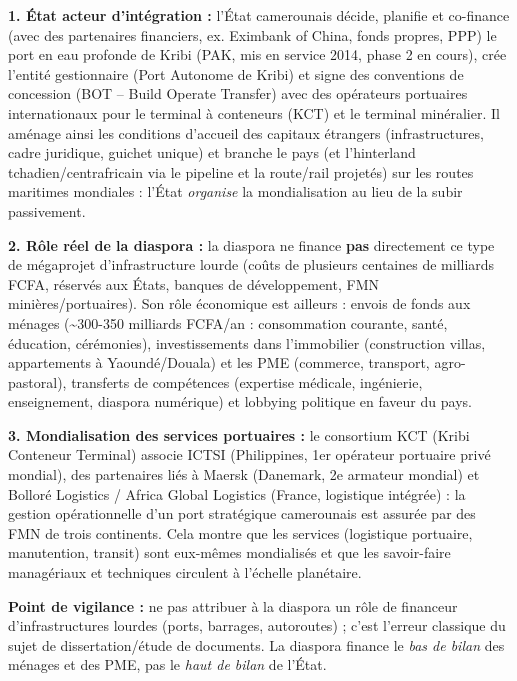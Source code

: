 \documentclass[11pt]{article}
\newcommand{\cle}[1]{{\popxbold\color{popdark}#1}}
\begin{document}
\begin{corrige}
\textbf{1. État acteur d'intégration :} l'État camerounais décide, planifie et co-finance (avec des partenaires financiers, ex. Eximbank of China, fonds propres, PPP) le port en eau profonde de Kribi (PAK, mis en service 2014, phase 2 en cours), crée l'entité gestionnaire (Port Autonome de Kribi) et signe des \cle{conventions de concession} (BOT -- Build Operate Transfer) avec des opérateurs portuaires internationaux pour le terminal à conteneurs (KCT) et le terminal minéralier. Il aménage ainsi les conditions d'accueil des capitaux étrangers (infrastructures, cadre juridique, guichet unique) et branche le pays (et l'hinterland tchadien/centrafricain via le pipeline et la route/rail projetés) sur les routes maritimes mondiales : l'État \emph{organise} la mondialisation au lieu de la subir passivement.

\textbf{2. Rôle réel de la diaspora :} la diaspora ne finance \textbf{pas} directement ce type de mégaprojet d'infrastructure lourde (coûts de plusieurs centaines de milliards FCFA, réservés aux États, banques de développement, FMN minières/portuaires). Son rôle économique est ailleurs : \cle{envois de fonds} aux ménages (\textasciitilde 300-350 milliards FCFA/an : consommation courante, santé, éducation, cérémonies), investissements dans l'\cle{immobilier} (construction villas, appartements à Yaoundé/Douala) et les \cle{PME} (commerce, transport, agro-pastoral), transferts de compétences (expertise médicale, ingénierie, enseignement, diaspora numérique) et lobbying politique en faveur du pays.

\textbf{3. Mondialisation des services portuaires :} le consortium KCT (Kribi Conteneur Terminal) associe ICTSI (Philippines, 1er opérateur portuaire privé mondial), des partenaires liés à Maersk (Danemark, 2e armateur mondial) et Bolloré Logistics / Africa Global Logistics (France, logistique intégrée) : la gestion opérationnelle d'un port stratégique camerounais est assurée par des FMN de trois continents. Cela montre que les \cle{services} (logistique portuaire, manutention, transit) sont eux-mêmes mondialisés et que les savoir-faire managériaux et techniques circulent à l'échelle planétaire.

\textbf{Point de vigilance :} ne pas attribuer à la diaspora un rôle de financeur d'infrastructures lourdes (ports, barrages, autoroutes) ; c'est l'erreur classique du sujet de dissertation/étude de documents. La diaspora finance le \emph{bas de bilan} des ménages et des PME, pas le \emph{haut de bilan} de l'État.
\end{corrige}
\end{document}
